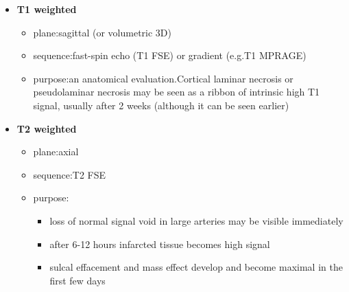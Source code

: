 \begin{itemize}
	\tightlist
	\item
	\textbf{T1 weighted}
	
	\begin{itemize}
		\tightlist
		\item
		plane:sagittal (or volumetric 3D)
		\item
		sequence:fast-spin echo (T1 FSE) or gradient (e.g.T1 MPRAGE)
		\item
		purpose:an anatomical evaluation.Cortical laminar necrosis or pseudolaminar necrosis may be seen as a ribbon of intrinsic high T1 signal, usually after 2 weeks (although it can be seen earlier) 
	\end{itemize}
	\item
	\textbf{T2 weighted}
	
	\begin{itemize}
		\tightlist
		\item
		plane:axial
		\item
		sequence:T2 FSE
		\item
		purpose:
		
		\begin{itemize}
			\tightlist
			\item
			loss of normal signal void in large arteries may be visible immediately
			\item
			after 6-12 hours infarcted tissue becomes high signal 
			\item
			sulcal effacement and mass effect develop and become maximal in the first few days
		\end{itemize}
	\end{itemize}
\end{itemize}

